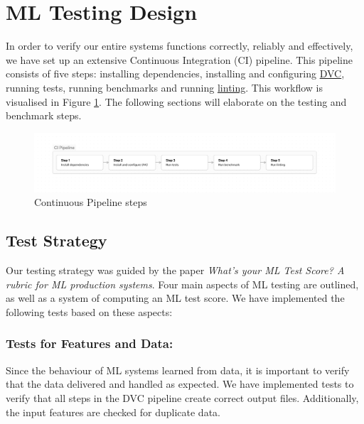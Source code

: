 
\section{ML Testing Design}
In order to verify our entire systems functions correctly, reliably and effectively, we have set up an extensive Continuous Integration (CI) pipeline. This pipeline consists of five steps: installing dependencies, installing and configuring \hyperref[sec:ml-pipeline:dvc]{DVC}, running tests, running benchmarks and running \hyperref[sec:ml-pipeline:lint]{linting}. This workflow is visualised in Figure \ref{fig:ci-pipeline}. The following sections will elaborate on the testing and benchmark steps.

\begin{figure}[h]
    \centering
    \includegraphics[width=\textwidth]{images/ci_pipeline.png}
    \caption{Continuous Pipeline steps}
    \label{fig:ci-pipeline}
\end{figure}

\subsection{Test Strategy}
Our testing strategy was guided by the paper \textit{What’s your ML Test Score? A rubric for ML production systems}\cite{mltestscore}. Four main aspects of ML testing are outlined, as well as a system of computing an ML test score. We have implemented the following tests based on these aspects:

\subsubsection{Tests for Features and Data:} Since the behaviour of ML systems learned from data, it is important to verify that the data delivered and handled as expected. We have implemented tests to verify that all steps in the DVC pipeline create correct output files. Additionally, the input features are checked for duplicate data.


